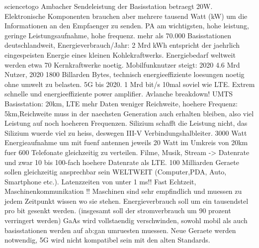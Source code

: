 \vspace{2cm}
sciencetogo Ambacher
Sendeleistung der Basisstation betraegt 20W. Elektronische Komponenten brauchen aber mehrere tausend Watt (kW) um die Informationen an den Empfaenger zu senden. PA am wichtigsten, hohe leistung, geringe Leistungsaufnahme, hohe frequenz. mehr als 70.000 Basisstationen deutschlandweit, Energieverbrauch/Jahr: 2 Mrd kWh entspricht der jaehrlich eingespeisten Energie eines kleinen Kohlekraftwerks. Energiebedarf weltweit werden etwa 70 Kernkraftwerke noetig. Mobilfunknutzer steigt: 2020 4.6 Mrd Nutzer, 2020 1800 Billarden Bytes, technisch energieeffiziente loesungen noetig ohne umwelt zu belasten. 5G bis 2020. 1 Mrd bit/s 10mal soviel wie LTE. Extrem schnelle und energieeffiziente power amplifier. Avlanche breakdown! UMTS Basisstation: 20km, LTE mehr Daten weniger Reichweite, hoehere Frequenz: 5km,Reichweite muss in der naechsten Generation auch erhalten bleiben, also viel Leistung auf noch hoeheren Frequenzen. Silizium schafft die Leistung nicht, das Silizium wuerde viel zu heiss, deswegen III-V Verbindungshalbleiter. 3000 Watt Energieaufnahme um mit fuenf antennen jeweils 20 Watt im Umkreis von 20km fuer 600 Telefonate gleichzeitig zu verteilen. Filme, Musik, Stream -> Datenrate und zwar 10 bis 100-fach hoehere Datenrate als LTE. 100 Milliarden Geraete sollen gleichzeitig ansprechbar sein WELTWEIT (Computer,PDA, Auto, Smartphone etc.). Latenzzeiten von unter 1 ms!! Fast Echtzeit, Maschinenkommunikation !! Maschinen sind sehr empfindlich und muessen zu jedem Zeitpunkt wissen wo sie stehen. Energieverbrauch soll um ein tausendstel pro bit gesenkt werden. (insgesamt soll der stromverbrauch um 90 prozent verringert werden) GaAs wird vollstaendig verschwinden, sowohl mobil als auch basisstationen werden auf \gls{ab:gan} umruesten muessen. Neue Geraete werden notwendig, 5G wird nicht kompatibel sein mit den alten Standards. 
